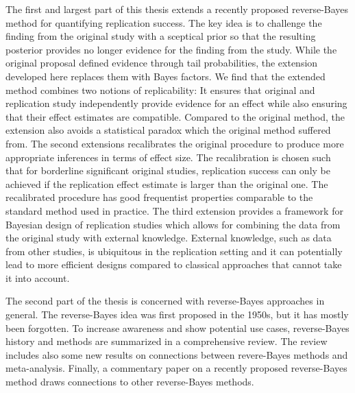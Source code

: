 The first and largest part of this thesis extends a recently proposed
reverse-Bayes method for quantifying replication success. The key idea is to
challenge the finding from the original study with a sceptical prior so that the
resulting posterior provides no longer evidence for the finding from the study.
While the original proposal defined evidence through tail probabilities, the
extension developed here replaces them with Bayes
factors. %
We find that the extended method combines two notions of replicability: It
ensures that original and replication study independently provide evidence for
an effect while also ensuring that their effect estimates are compatible.
Compared to the original method, the extension also avoids a statistical paradox
which the original method suffered from.
The second extensions recalibrates the original procedure to produce more
appropriate inferences in terms of effect size. %
The recalibration is chosen such that for borderline significant original
studies, replication success can only be achieved if the replication effect
estimate is larger than the original one. The recalibrated procedure has good
frequentist properties comparable to the standard method used in practice. The
third extension provides a framework for Bayesian design of replication studies
which allows for combining the data from the original study with external
knowledge. External knowledge, such as data from other studies, is ubiquitous in
the replication setting and it can potentially lead to more efficient designs
compared to classical approaches that cannot take it into account.

The second part of the thesis is concerned with reverse-Bayes approaches in
general. The reverse-Bayes idea was first proposed in the 1950s, but it has
mostly been forgotten. To increase awareness and show potential use cases,
reverse-Bayes history and methods are summarized in a comprehensive review. The
review includes also some new results on connections between revere-Bayes
methods and meta-analysis. Finally, a commentary paper on a recently proposed
reverse-Bayes method draws connections to other reverse-Bayes methods.


